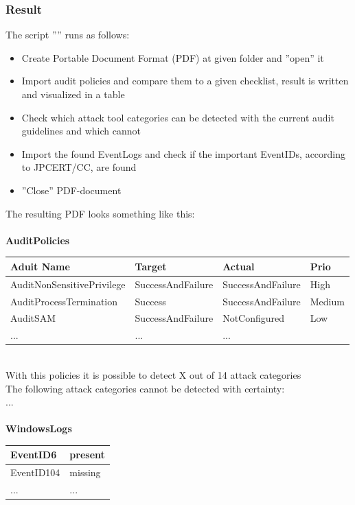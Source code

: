 \subsubsection{Result} \label{resultVisualize}
The script '''' runs as follows:
\begin{itemize}
    \item Create Portable Document Format (PDF) at given folder and ''open'' it
    \item Import audit policies and compare them to a given checklist, result is written and visualized in a table
    \item Check which attack tool categories can be detected with the current audit guidelines and which cannot
    \item Import the found EventLogs and check if the important EventIDs, according to JPCERT/CC, are found
    \item ''Close'' PDF-document
\end{itemize}
The resulting PDF looks something like this: \ \\
\ \\
\textbf{AuditPolicies}
\begin{table}[H]
    \centering
    \begin{tabular}{| p{4.5cm} |  p{4cm} | p{4cm} | p{2.5cm}|} \hline
        Aduit Name & Target & Actual & Prio\\ \hline
        AuditNonSensitivePrivilege & SuccessAndFailure &\cellcolor{green} SuccessAndFailure & High\\ \hline
        AuditProcessTermination & Success &\cellcolor{darkgreen} SuccessAndFailure & Medium \\ \hline
        AuditSAM & SuccessAndFailure &\cellcolor{red} NotConfigured & Low\\ \hline
        ... & ... & ... &\\ \hline
    \end{tabular}
\end{table}\ \\
With this policies it is possible to detect X out of 14 attack categories \ \\
The following attack categories cannot be detected with certainty: \\
... \ \\
\ \\
\textbf{WindowsLogs}
\begin{table}[H]
    \centering
    \begin{tabular}{| p{8cm} |  p{8cm} |} \hline
        EventID6 & present \\ \hline
        EventID104 & missing \\ \hline
        ... & ... \\ \hline
    \end{tabular}
\end{table}
